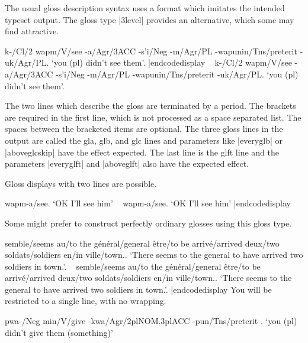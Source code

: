 \noindent  The usual gloss description syntax uses a format which
imitates the intended typeset output.  The gloss type |3level|
provides an alternative, which some may find attractive.

\codedisplay
\ex[glstyle=3level]
\begingl
{k-/Cl/2} {wapm/V/see} {-a/Agr/3\sc ACC} {-s'i/Neg} {-m/Agr/\sc PL}
{-wapunin/Tns/preterit} {-uk/Agr/\sc PL}.
`you (pl) didn't see them'.
\endgl
\xe
|endcodedisplay
\framedisplay~
\ex[glstyle=3level,aboveglaskip=0pt,aboveglbskip=0pt]
\begingl
{k-/Cl/2} {wapm/V/see} {-a/Agr/3\sc ACC} {-s'i/Neg}
{-m/Agr/\sc PL} {-wapunin/Tns/preterit} {-uk/Agr/\sc PL}.
`you (pl) didn't see them'.
\endgl
\xe
\endframedisplay

\smallskip
\noindent The two lines which describe the gloss are terminated
by a period.  The brackets are required in the first line, which
is not processed as a space separated list.  The spaces between
the bracketed items are optional. The three gloss lines in the
output are called the gla, glb, and glc lines and parameters like
|everyglb| or |aboveglcskip| have the effect expected.  The last
line is the glft line and the parameters |everyglft| and
|aboveglft| also have the expected effect.

Gloss displays with two lines are possible.

\framedisplay
\ex
{} {wapm-a/see}.
`OK I'll see him'
\endgl
\xe
\endframedisplay
\codedisplay~
\ex
{} {wapm-a/see}.
`OK I'll see him'
\endgl
\xe
|endcodedisplay

Some might prefer to construct perfectly ordinary glosses using
this gloss type.

\framedisplay
\ex
{} {semble/seems} {au/to the} {g\'en\'eral/general}
{\^etre/to be} {arriv\'e/arrived} {deux/two} {soldats/soldiers}
{en/in} {ville/town.}.
`There seems to the general to have arrived two soldiers in
town{.}'.
\endgl
\xe
\endframedisplay
\codedisplay~
\ex
{} {semble/seems} {au/to the} {g\'en\'eral/general}
{\^etre/to be} {arriv\'e/arrived} {deux/two} {soldats/soldiers}
{en/in} {ville/town.}.
`There seems to the general to have arrived two soldiers in town{.}'.
\endgl
\xe
|endcodedisplay
\noindent You will be restricted to a single line, with no
wrapping.

\framedisplay
\ex[glstyle=3level]
\begingl
{pwa-/Neg} {min/V/give} {-kwa/Agr/2pl{\sc NOM}.3pl\sc ACC}
{-pun/Tns/preterit} .
`you (pl) didn't give them (something)'
\endgl
\xe
\endframedisplay

